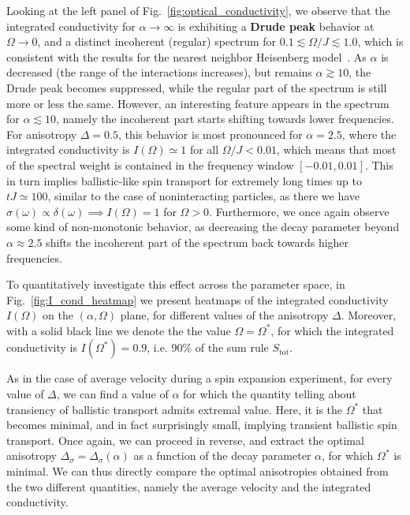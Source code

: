 Looking at the left panel of Fig.~\ref{fig:optical_conductivity}, we observe that the integrated conductivity
for \(\alpha \to \infty\) is exhibiting a \textbf{Drude peak} behavior at \(\Omega \to 0\), and a distinct 
incoherent (regular) spectrum for \(0.1 \lesssim \Omega / J \lesssim 1.0\), which is consistent with the results
for the nearest neighbor Heisenberg model~\autocite{Prelovsek2021}. As \(\alpha\) is decreased 
(the range of the interactions increases), but remains \(\alpha \gtrsim 10\), the Drude peak
becomes suppressed, while the regular part of the spectrum is still more or less the same.
However, an interesting feature appears in the spectrum for \(\alpha \lesssim 10\), namely
the incoherent part starts shifting towards lower frequencies. For anisotropy \(\Delta = 0.5\),
this behavior is most pronounced for \(\alpha = 2.5\), where the integrated conductivity
is \(I(\Omega)\simeq 1 \) for all \( \Omega/J < 0.01\), which means that most of the spectral weight
is contained in the frequency window \(\left[-0.01,0.01\right]\). This in turn implies ballistic-like 
spin transport for extremely long times up to \(tJ \simeq 100\), similar to the case of noninteracting particles,
as there we have \(\sigma(\omega) \propto \delta(\omega) \implies I(\Omega) = 1\) for \(\Omega > 0\). Furthermore,
we once again observe some kind of non-monotonic behavior, as decreasing the decay parameter
beyond \(\alpha \approx 2.5\) shifts the incoherent part of the spectrum back towards higher frequencies.

To quantitatively investigate this effect across the parameter space, in Fig.~\ref{fig:I_cond_heatmap}
we present heatmaps of the integrated conductivity \(I(\Omega)\) on the \((\alpha ,\Omega)\) plane, 
for different values of the anisotropy \(\Delta\). Moreover, with a solid black line we denote the
the value \(\Omega = \Omega^{\ast}\), for which the integrated conductivity is \(I(\Omega^{\ast}) = 0.9\),
i.e. 90\% of the sum rule \(S_{\mathrm{tot}}\).


As in the case of average velocity during a spin expansion experiment, 
for every value of \(\Delta\), we can find a value of \(\alpha\) for which the quantity telling about transiency
of ballistic transport admits extremal value. Here, it is the \(\Omega^{\ast}\) that becomes minimal,
and in fact surprisingly small, implying transient ballistic spin transport. Once again, we can proceed 
in reverse, and extract the optimal anisotropy \(\Delta_{\sigma} = \Delta_{\sigma}(\alpha)\) as a function
of the decay parameter \(\alpha\), for which \(\Omega^{\ast}\) is minimal. We can thus directly compare
the optimal anisotropies obtained from the two different quantities, namely the average velocity and the integrated conductivity.

